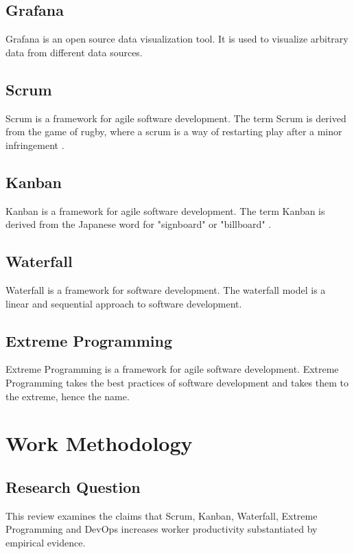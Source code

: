 \documentclass[12pt]{article}
\begin{document}
\subsection{Grafana}
Grafana \cite{GrafanaOpenComposable} is an open source data visualization tool.
It is used to visualize arbitrary data from different data sources.

\subsection{Scrum}
Scrum \cite{HomeScrumorg} is a framework for agile \cite{AgileSoftwareDevelopment2025} software development. 
The term Scrum is derived from the game of rugby, where a scrum is a way of restarting play after a minor infringement \cite{ScrumRugbyUnion2025}.

\subsection{Kanban}
Kanban \cite{Kanban2025} is a framework for agile software development.
The term Kanban is derived from the Japanese word for "signboard" or "billboard" \cite{KanbanDevelopment2025}.

\subsection{Waterfall}
Waterfall \cite{WaterfallModel2025} is a framework for software development.
The waterfall model is a linear and sequential approach to software development.

\subsection{Extreme Programming}
Extreme Programming \cite{ExtremeProgramming2025} is a framework for agile software development.
Extreme Programming takes the best practices of software development and takes them to the extreme, hence the name.

\section{Work Methodology}

\subsection{Research Question}
This review examines the claims that Scrum, Kanban, Waterfall, Extreme Programming and DevOps 
increases worker productivity substantiated by empirical evidence.
\end{document}
